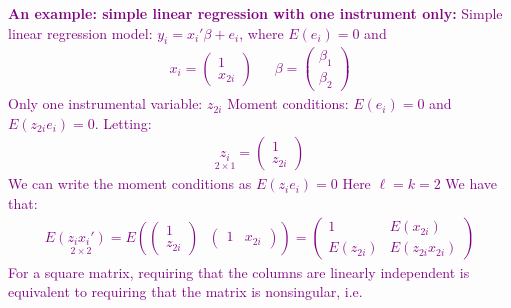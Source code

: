\documentclass[a4paper,twoside,11pt]{article}
\begin{document}
\textcolor{Purple}{
\textbf{An example: simple linear regression with one instrument only:}
\newline
\newline
Simple linear regression model: $y_i = x_i' \beta + e_i$, where $E(e_i)=0$ and
\begin{equation*}
\begin{aligned}
x_i = \begin{pmatrix}
1 \\ 
x_{2i}
\end{pmatrix} \ \ \ \ \ \ \ \beta = \begin{pmatrix}
\beta_1 \\
\beta_2
\end{pmatrix}
\end{aligned} 
\end{equation*}
Only one instrumental variable: $z_{2i}$
\newline
\newline
Moment conditions: $E(e_i)=0$ and $E(z_{2i} e_i) =0 $. Letting:
\begin{equation*}
\begin{aligned}
\underset{2 \times 1}{z_i} = \begin{pmatrix}
1 \\
z_{2i}
\end{pmatrix}
\end{aligned} 
\end{equation*}
We can write the moment conditions as $E(z_ie_i)=0$ \newline
\newline
Here $\ell = k =2$
\newline
\newline
We have that:
\begin{equation*}
\begin{aligned}
E \underset{2 \times 2}{(z_ix_i')} = E( \begin{pmatrix}
1 \\ 
z_{2i}
\end{pmatrix} \ \ \ \begin{pmatrix}
1 & x_{2i}
\end{pmatrix}) = \begin{pmatrix}
1 & E(x_{2i}) \\
E(z_{2i}) & E(z_{2i} x_{2i})
\end{pmatrix}
\end{aligned} 
\end{equation*}
For a square matrix, requiring that the columns are linearly independent is equivalent to requiring that the matrix is nonsingular, i.e.
}
\end{document}

